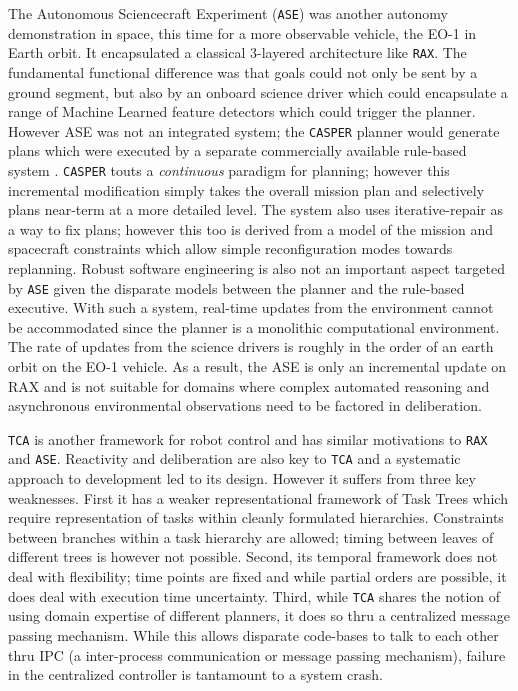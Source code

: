 The Autonomous Sciencecraft Experiment (\texttt{ASE}) \cite{chien99,
  chien03} was another autonomy demonstration in space, this time for
a more observable vehicle, the EO-1 in Earth orbit. It encapsulated a
classical 3-layered architecture like \texttt{RAX}. The fundamental
functional difference was that goals could not only be sent by a
ground segment, but also by an onboard science driver which could
encapsulate a range of Machine Learned feature detectors which could
trigger the planner. However ASE was not an integrated system; the
\texttt{CASPER} planner \cite{chien00} would generate plans which were
executed by a separate commercially available rule-based system
\cite{icl}. \texttt{CASPER} touts a \emph{continuous} paradigm for
planning; however this incremental modification simply takes the
overall mission plan and selectively plans near-term at a more
detailed level. The system also uses iterative-repair as a way to fix
plans; however this too is derived from a model of the mission and
spacecraft constraints which allow simple reconfiguration modes
towards replanning. Robust software engineering is also not an
important aspect targeted by \texttt{ASE} given the disparate models
between the planner and the rule-based executive. With such a system,
real-time updates from the environment cannot be accommodated since
the planner is a monolithic computational environment. The rate of
updates from the science drivers is roughly in the order of an earth
orbit on the EO-1 vehicle. As a result, the ASE is only an incremental
update on RAX and is not suitable for domains where complex automated
reasoning and asynchronous environmental observations need to be
factored in deliberation.

\texttt{TCA} \cite{simmons94} is another framework for robot control
and has similar motivations to \texttt{RAX} and
\texttt{ASE}. Reactivity and deliberation are also key to \texttt{TCA}
and a systematic approach to development led to its design. However it
suffers from three key weaknesses. First it has a weaker
representational framework of Task Trees which require representation
of tasks within cleanly formulated hierarchies. Constraints between
branches within a task hierarchy are allowed; timing between leaves of
different trees is however not possible. Second, its temporal
framework does not deal with flexibility; time points are fixed and
while partial orders are possible, it does deal with execution time
uncertainty. Third, while \texttt{TCA} shares the notion of using
domain expertise of different planners, it does so thru a centralized
message passing mechanism. While this allows disparate code-bases to
talk to each other thru IPC (a inter-process communication or message
passing mechanism), failure in the centralized controller is
tantamount to a system crash.

